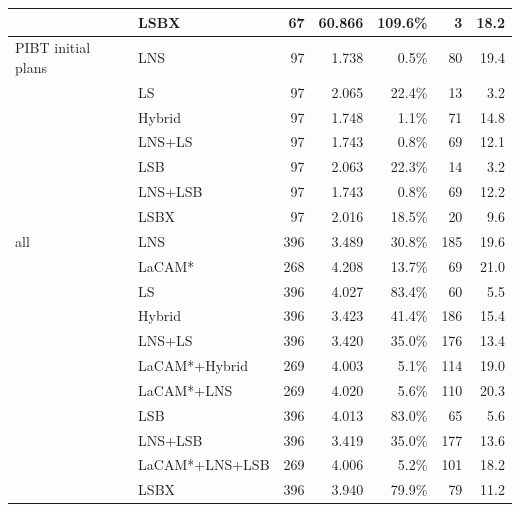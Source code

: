 \begin{table}[t]
\begin{tabular}{llrrrrr}
 & LSBX & 67 & 60.866 & 109.6\% & 3 & 18.2\\
\midrule
PIBT initial plans & LNS & 97 & 1.738 & 0.5\% & 80 & 19.4\\
 & LS & 97 & 2.065 & 22.4\% & 13 & 3.2\\
 & Hybrid & 97 & 1.748 & 1.1\% & 71 & 14.8\\
 & LNS+LS & 97 & 1.743 & 0.8\% & 69 & 12.1\\
 & LSB & 97 & 2.063 & 22.3\% & 14 & 3.2\\
 & LNS+LSB & 97 & 1.743 & 0.8\% & 69 & 12.2\\
 & LSBX & 97 & 2.016 & 18.5\% & 20 & 9.6\\
\midrule
all & LNS & 396 & 3.489 & 30.8\% & 185 & 19.6\\
 & LaCAM* & 268 & 4.208 & 13.7\% & 69 & 21.0\\
 & LS & 396 & 4.027 & 83.4\% & 60 & 5.5\\
 & Hybrid & 396 & 3.423 & 41.4\% & 186 & 15.4\\
 & LNS+LS & 396 & 3.420 & 35.0\% & 176 & 13.4\\
 & LaCAM*+Hybrid & 269 & 4.003 & 5.1\% & 114 & 19.0\\
 & LaCAM*+LNS & 269 & 4.020 & 5.6\% & 110 & 20.3\\
 & LSB & 396 & 4.013 & 83.0\% & 65 & 5.6\\
 & LNS+LSB & 396 & 3.419 & 35.0\% & 177 & 13.6\\
 & LaCAM*+LNS+LSB & 269 & 4.006 & 5.2\% & 101 & 18.2\\
 & LSBX & 396 & 3.940 & 79.9\% & 79 & 11.2\\
\bottomrule
\end{tabular}
\end{table}

